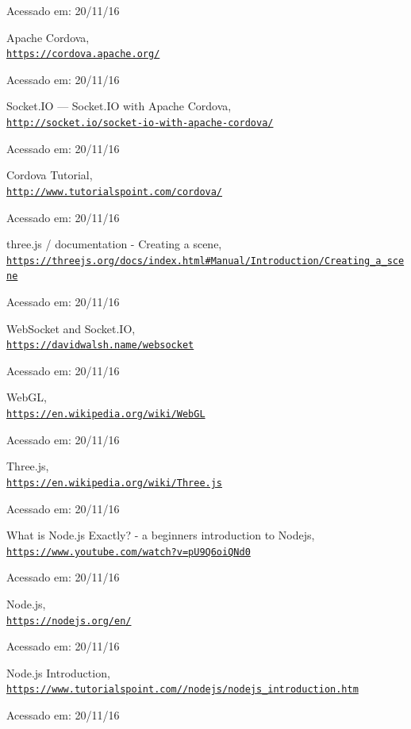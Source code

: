 \documentclass[a4paper,12pt]{article}
\begin{document}
\begin{thebibliography}{50}
Acessado em: 20/11/16


Apache Cordova,
\\\texttt{\url{https://cordova.apache.org/}}

Acessado em: 20/11/16


Socket.IO  —  Socket.IO with Apache Cordova,
\\\texttt{\url{http://socket.io/socket-io-with-apache-cordova/}}

Acessado em: 20/11/16


Cordova Tutorial,
\\\texttt{\url{http://www.tutorialspoint.com/cordova/}}

Acessado em: 20/11/16


three.js / documentation - Creating a scene,
\\\texttt{\url{https://threejs.org/docs/index.html\#Manual/Introduction/Creating_a_scene}}

Acessado em: 20/11/16


WebSocket and Socket.IO,
\\\texttt{\url{https://davidwalsh.name/websocket}}

Acessado em: 20/11/16


WebGL,
\\\texttt{\url{https://en.wikipedia.org/wiki/WebGL}}

Acessado em: 20/11/16


Three.js,
\\\texttt{\url{https://en.wikipedia.org/wiki/Three.js}}

Acessado em: 20/11/16


What is Node.js Exactly? - a beginners introduction to Nodejs,
\\\texttt{\url{https://www.youtube.com/watch?v=pU9Q6oiQNd0}}

Acessado em: 20/11/16


Node.js,
\\\texttt{\url{https://nodejs.org/en/}}

Acessado em: 20/11/16


Node.js Introduction,
\\\texttt{\url{https://www.tutorialspoint.com//nodejs/nodejs_introduction.htm}}

Acessado em: 20/11/16



\end{thebibliography}
\end{document}
